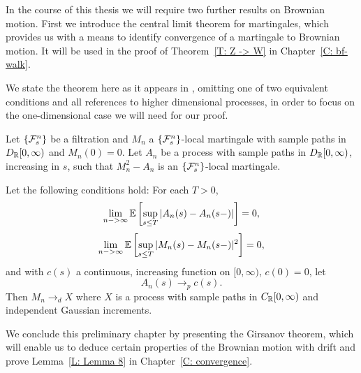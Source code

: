 In the course of this thesis we will require two further results on Brownian motion.
First we introduce the central limit theorem for martingales,
which provides us with a means to identify convergence of a martingale to Brownian motion.
It will be used in the proof of Theorem~\ref{T: Z -> W} in Chapter~\ref{C: bf-walk}.

We state the theorem here as it appears in \cite[Theorem 1.4, p.339 f.]{Ethier.2005},
omitting one of two equivalent conditions and all references to higher dimensional processes,
in order to focus on the one-dimensional case we will need for our proof.

\begin{theorem} \label{T: functional CLT martingales}
	Let $\{\mathcal{F}^n_{s}\}$ be a filtration and $M_n$ a $\{\mathcal{F}^n_{s}\}$-local martingale with sample paths in $D_{\mathbb{R}}[0,\infty)$ and $M_n(0)=0$.
	Let $A_n$ be a process with sample paths in $D_{\mathbb{R}}[0,\infty)$, increasing in $s$, such that $M_n^2 - A_n$ is an $\{\mathcal{F}^n_{s}\}$-local martingale.
	
	Let the following conditions hold:
	For each $T>0$,
	\begin{equation} \label{E: cond1 CLT}
	\lim_{n->\infty} \mathbb{E} \left[ 
		\sup_{s \leq T} | A_n(s) - A_n(s-)|
	 \right] = 0,
	\end{equation}
	\begin{equation} \label{E: cond2 CLT}
	\lim_{n->\infty} \mathbb{E} \left[ 
		\sup_{s \leq T} | M_n(s) - M_n(s-)|^2
	 \right] = 0,
	\end{equation}
	and with $c(s)$ a continuous, increasing function on $[0, \infty)$, $c(0) = 0$, let
	\begin{equation} \label{E: cond3 CLT}
	A_n(s) \longrightarrow_p c(s).
	\end{equation}
	Then $M_n \longrightarrow_d X$ where $X$ is a process with sample paths in $C_{\mathbb{R}}[0,\infty)$ and independent Gaussian increments.
\end{theorem}


We conclude this preliminary chapter by presenting the Girsanov theorem,
which will enable us to deduce certain properties of the Brownian motion with drift
and prove Lemma~\ref{L: Lemma 8} in Chapter~\ref{C: convergence}.

